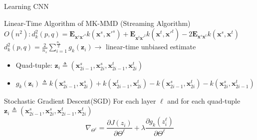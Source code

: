 \documentclass{beamer}
\begin{document}
\begin{frame}[fragile]{Learning CNN}
\begin{block}{Linear-Time Algorithm of MK-MMD (Streaming Algorithm)}
$O(n^2):d_k^2(p,q)=\mathbf{E}_{\mathbf{x}^s\mathbf{x}\prime^s}k(\mathbf{x}^s,\mathbf{x}\prime^s)+\mathbf{E}_{\mathbf{x}^t\mathbf{x}\prime^t}k(\mathbf{x}^t,\mathbf{x}\prime^t)-2\mathbf{E}_{\mathbf{x}^s\mathbf{x}^t}k(\mathbf{x}^s,\mathbf{x}^t)$
$d_k^2(p,q)=\frac{2}{n_s}\sum\nolimits_{i=1}^{\frac{n_s}{2}}g_k(\mathbf{z}_i) \to$ linear-time unbiased estimate
\begin{itemize}
\item{Quad-tuple: $\textbf{z}_i\triangleq (\textbf{x}_{2i-1}^s, \textbf{x}_{2i}^s, \textbf{x}_{2i-1}^t, \textbf{x}_{2i}^t)$}
\item{$g_k(\textbf{z}_i) \triangleq k(\textbf{x}_{2i-1}^s, \textbf{x}_{2i}^s) + k(\textbf{x}_{2i-1}^t, \textbf{x}_{2i}^t) - k(\textbf{x}_{2i-1}^s, \textbf{x}_{2i}^t) - k(\textbf{x}_{2i}^s, \textbf{x}_{2i-1}^t)$}
\end{itemize}
\end{block}
\begin{block}{Stochastic Gradient Descent(SGD)}
For each layer $\ell$ and for each quad-tuple $\textbf{z}_i\triangleq (\textbf{x}_{2i-1}^s, \textbf{x}_{2i}^s, \textbf{x}_{2i-1}^t, \textbf{x}_{2i}^t)$
\begin{equation}
\nabla_{\Theta^\ell}=\frac{\partial{J(z_i)}}{\partial\Theta^\ell}+\lambda\frac{\partial g_k(z_i^\ell)}{\partial \Theta^\ell}
\end{equation}
\end{block}
\end{frame}
\end{document}
